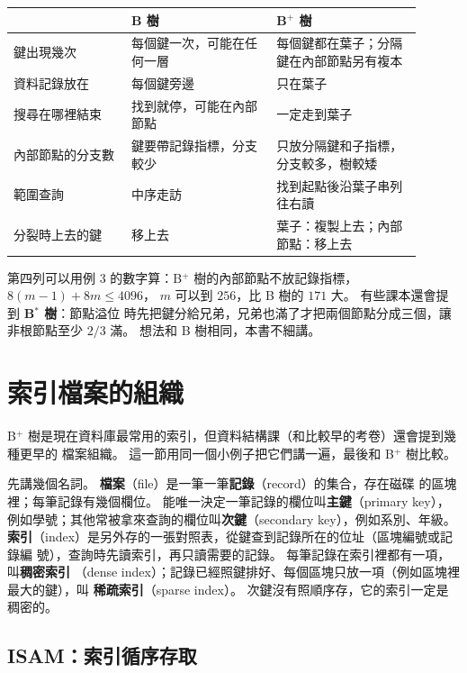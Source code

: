 \begin{center}
\begin{tabular}{p{0.26\linewidth}p{0.32\linewidth}p{0.32\linewidth}}
\toprule
 & B 樹 & B$^{+}$ 樹 \\
\midrule
鍵出現幾次 & 每個鍵一次，可能在任何一層 & 每個鍵都在葉子；分隔鍵在內部節點另有複本 \\
資料記錄放在 & 每個鍵旁邊 & 只在葉子 \\
搜尋在哪裡結束 & 找到就停，可能在內部節點 & 一定走到葉子 \\
內部節點的分支數 & 鍵要帶記錄指標，分支較少 & 只放分隔鍵和子指標，分支較多，樹較矮 \\
範圍查詢 & 中序走訪 & 找到起點後沿葉子串列往右讀 \\
分裂時上去的鍵 & 移上去 & 葉子：複製上去；內部節點：移上去 \\
\bottomrule
\end{tabular}
\end{center}

第四列可以用例 3 的數字算：B$^{+}$ 樹的內部節點不放記錄指標，$8(m - 1) + 8m \le 4096$，
$m$ 可以到 $256$，比 B 樹的 $171$ 大。 有些課本還會提到 \textbf{B$^{*}$ 樹}：節點溢位
時先把鍵分給兄弟，兄弟也滿了才把兩個節點分成三個，讓非根節點至少 $2/3$ 滿。 想法和
B 樹相同，本書不細講。

\section{索引檔案的組織}
\label{sec:mw-index}

B$^{+}$ 樹是現在資料庫最常用的索引，但資料結構課（和比較早的考卷）還會提到幾種更早的
檔案組織。 這一節用同一個小例子把它們講一遍，最後和 B$^{+}$ 樹比較。

先講幾個名詞。 \textbf{檔案}（file）是一筆一筆\textbf{記錄}（record）的集合，存在磁碟
的區塊裡；每筆記錄有幾個欄位。 能唯一決定一筆記錄的欄位叫\textbf{主鍵}（primary key），
例如學號；其他常被拿來查詢的欄位叫\textbf{次鍵}（secondary key），例如系別、年級。
\textbf{索引}（index）是另外存的一張對照表，從鍵查到記錄所在的位址（區塊編號或記錄編
號），查詢時先讀索引，再只讀需要的記錄。 每筆記錄在索引裡都有一項，叫\textbf{稠密索引}
（dense index）；記錄已經照鍵排好、每個區塊只放一項（例如區塊裡最大的鍵），叫
\textbf{稀疏索引}（sparse index）。 次鍵沒有照順序存，它的索引一定是稠密的。

\subsection{ISAM：索引循序存取}
\label{sec:mw-isam}

